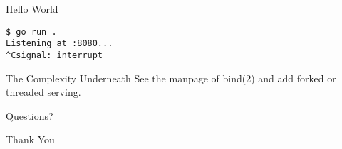 \documentclass{beamer}
\begin{document}
\begin{frame}[fragile]{Hello World}
\begin{lstlisting}
$ go run .
Listening at :8080...
^Csignal: interrupt
\end{lstlisting}
\end{frame}

\begin{frame}{The Complexity Underneath}
See the manpage of bind(2) and add forked or threaded serving.
\end{frame}

\begin{frame}{Questions?}
\end{frame}

\begin{frame}{Thank You}
\end{frame}
\end{document}
